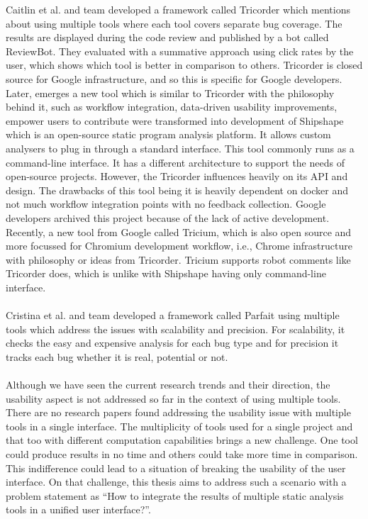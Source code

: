 Caitlin et al. and team developed a framework called Tricorder \cite{tricorder} which mentions about using multiple tools where each tool covers separate bug coverage. The results are displayed during the code review and published by a bot called ReviewBot. They evaluated with a summative approach using click rates by the user, which shows which tool is better in comparison to others. Tricorder is closed source for Google infrastructure, and so this is specific for Google developers. Later, emerges a new tool which is similar to Tricorder with the philosophy behind it, such as workflow integration, data-driven usability improvements, empower users to contribute were transformed into development of Shipshape \cite{shipshape} which is an open-source static program analysis platform. It allows custom analysers to plug in through a standard interface. This tool commonly runs as a command-line interface. It has a different architecture to support the needs of open-source projects. However, the Tricorder influences heavily on its API and design. The drawbacks of this tool being it is heavily dependent on docker and not much workflow integration points with no feedback collection. Google developers archived this project because of the lack of active development. Recently, a new tool from Google called Tricium, \cite{tricium} which is also open source and more focussed for Chromium development workflow, i.e., Chrome infrastructure with philosophy or ideas from Tricorder. Tricium supports robot comments like Tricorder does, which is unlike with Shipshape having only command-line interface. \\ \\

Cristina et al. and team developed a framework called Parfait \cite{parfait} using multiple tools which address the issues with scalability and precision. For scalability, it checks the easy and expensive analysis for each bug type and for precision it tracks each bug whether it is real, potential or not. \\ \\

Although we have seen the current research trends and their direction, the usability aspect is not addressed so far in the context of using multiple tools. There are no research papers found addressing the usability issue with multiple tools in a single interface. The multiplicity of tools used for a single project and that too with different computation capabilities brings a new challenge. One tool could produce results in no time and others could take more time in comparison. This indifference could lead to a situation of breaking the usability of the user interface. On that challenge, this thesis aims to address such a scenario with a problem statement as “How to integrate the results of multiple static analysis tools in a unified user interface?”. \\ \\

